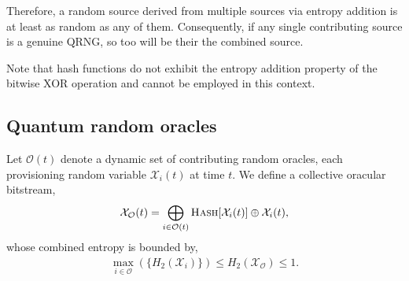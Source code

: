 Therefore, a random source derived from multiple sources via entropy addition is at least as random as any of them. Consequently, if any single contributing source is a genuine QRNG, so too will be their the combined source.

Note that hash functions do not exhibit the entropy addition property of the bitwise XOR operation and cannot be employed in this context.



\subsection{Quantum random oracles} \label{sec:quantum_rand_oracles}

Let $\mathcal{O}(t)$ denote a dynamic set of contributing random oracles, each provisioning random variable $\mathcal{X}_i(t)$ at time $t$. We define a collective oracular bitstream,
\begin{align} \label{eq:entropy_addition}
	\mathcal{X}_\mathcal{O}(t) = \bigoplus_{i\in{\mathcal{O}(t)}} \textsc{Hash}[\mathcal{X}_i(t)] \oplus \mathcal{X}_i(t),
\end{align}
whose combined entropy is bounded by,
\begin{align}
	\max_{i\in\mathcal{O}}(\{H_2(\mathcal{X}_i)\}) \leq H_2(\mathcal{X}_{\mathcal{O}}) \leq 1.
\end{align}


